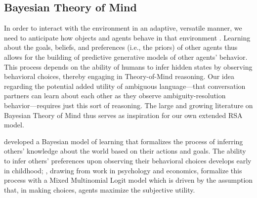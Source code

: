 \documentclass[11pt,a4paper]{article}
\begin{document}
\subsection{Bayesian Theory of Mind} \label{inferring}

In order to interact with the environment in an adaptive, versatile manner, we need to anticipate how objects and agents behave in that environment \cite{Butz:2016}. Learning about the goals, beliefs, and preferences (i.e., the priors) of other agents thus allows for the building of predictive generative models of other agents' behavior. This process depends on the ability of humans to infer hidden states by observing behavioral choices, thereby engaging in Theory-of-Mind reasoning. Our idea regarding the potential added utility of ambiguous language---that conversation partners can learn about each other as they observe ambiguity-resolution behavior---requires just this sort of reasoning. The large and growing literature on Bayesian Theory of Mind thus serves as inspiration for our own extended RSA model.

 developed a Bayesian model of learning that formalizes the process of inferring others' knowledge about the world based on their actions and goals. The ability to infer others' preferences upon observing their behavioral choices develops early in childhood; , drawing from work in psychology and economics, formalize this process with a Mixed Multinomial Logit model which is driven by the assumption that, in making choices, agents maximize the subjective utility.

\end{document}

